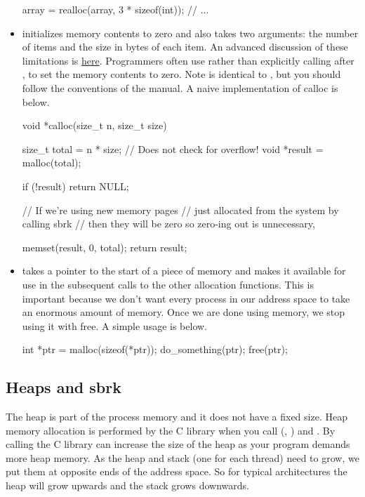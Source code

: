 \begin{itemize}
\begin{code}[language=C]
array = realloc(array, 3 * sizeof(int));
// ...
\end{code}

\item {} initializes memory contents to zero and also takes two arguments: the number of items and the size in bytes of each item. An advanced discussion of these limitations is \href{http://locklessinc.com/articles/calloc/}{here}. Programmers often use  rather than explicitly calling  after , to set the memory contents to zero. Note  is identical to , but you should follow the conventions of the manual. A naive implementation of calloc is below.

\begin{code}[language=C]
void *calloc(size_t n, size_t size)
{
    size_t total = n * size; // Does not check for overflow!
    void *result = malloc(total);
    
    if (!result) return NULL;
    
// If we're using new memory pages 
// just allocated from the system by calling sbrk
// then they will be zero so zero-ing out is unnecessary,

    memset(result, 0, total);
    return result; 
}
\end{code}

\item {} takes a pointer to the start of a piece of memory and makes it available for use in the subsequent calls to the other allocation functions. This is important because we don't want every process in our address space to take an enormous amount of memory. Once we are done using memory, we stop using it with free. A simple usage is below.

\begin{code}[language=C]
int *ptr = malloc(sizeof(*ptr));
do_something(ptr);
free(ptr);
\end{code}

\end{itemize}

\subsection{Heaps and sbrk}

The heap is part of the process memory and it does not have a fixed size. Heap memory allocation is performed by the C library when you call  (, ) and . By calling  the C library can increase the size of the heap as your program demands more heap memory. As the heap and stack (one for each thread) need to grow, we put them at opposite ends of the address space. So for typical architectures the heap will grow upwards and the stack grows downwards. 

